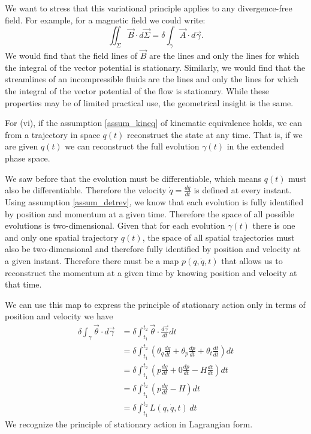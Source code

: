 \documentclass[10pt,twocolumn, nofootinbib]{revtex4-2}
\begin{document}
We want to stress that this variational principle applies to any divergence-free field. For example, for a magnetic field we could write:
\begin{equation*}
	\iint_{\Sigma} \vec{B} \cdot d\vec{\Sigma} = \delta \int_{\gamma} \vec{A} \cdot d\vec{\gamma}.
\end{equation*}
We would find that the field lines of $\vec{B}$ are the lines and only the lines for which the integral of the vector potential is stationary. Similarly, we would find that the streamlines of an incompressible fluids are the lines and only the lines for which the integral of the vector potential of the flow is stationary. While these properties may be of limited practical use, the geometrical insight is the same.

For (vi), if the assumption \ref{assum_kineq} of kinematic equivalence  holds, we can from a trajectory in space $q(t)$ reconstruct the state at any time. That is, if we are given $q(t)$ we can reconstruct the full evolution $\gamma(t)$ in the extended phase space.

We saw before that the evolution must be differentiable, which means $q(t)$ must also be differentiable. Therefore the velocity $\dot{q} = \frac{dq}{dt}$ is defined at every instant. Using assumption \ref{assum_detrev}, we know that each evolution is fully identified by position and momentum at a given time. Therefore the space of all possible evolutions is two-dimensional. Given that for each evolution $\gamma(t)$ there is one and only one spatial trajectory $q(t)$, the space of all spatial trajectories must also be two-dimensional and therefore fully identified by position and velocity at a given instant. Therefore there must be a map $p(q, \dot{q}, t)$ that allows us to reconstruct the momentum at a given time by knowing position and velocity at that time.

We can use this map to express the principle of stationary action only in terms of position and velocity we have
\begin{equation}
	\begin{aligned}
		\delta \int_\gamma \vec{\theta} \cdot d\vec{\gamma} &= \delta \int^{t_2}_{t_1} \vec{\theta} \cdot \frac{d\vec{\gamma}}{dt} dt \\
		&= \delta \int^{t_2}_{t_1} \left(\theta_q \frac{dq}{dt} + \theta_p \frac{dp}{dt} + \theta_t \frac{dt}{dt}\right) dt \\
		&= \delta\int^{t_2}_{t_1} \left(p \frac{dq}{dt} + 0 \frac{dp}{dt} - H \frac{dt}{dt}\right) dt \\
		&= \delta \int^{t_2}_{t_1} \left(p \frac{dq}{dt} - H\right) dt \\
		&= \delta \int^{t_2}_{t_1} L(q, \dot{q}, t) \, dt
	\end{aligned}
\end{equation}
We recognize the principle of stationary action in Lagrangian form.
\end{document}
